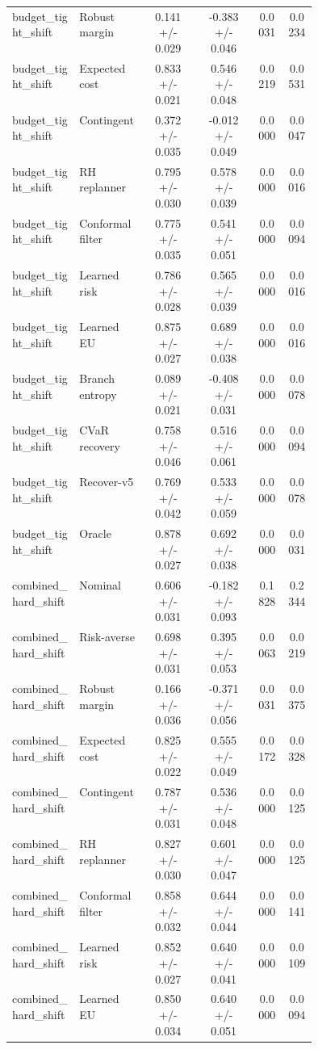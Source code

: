 \documentclass{article}
\begin{document}
\begin{center}
\begin{longtable}{p{0.22\linewidth}p{0.22\linewidth}cccc}
budget\_tight\_shift & Robust margin & 0.141 +/- 0.029 & -0.383 +/- 0.046 & 0.0031 & 0.0234\\
budget\_tight\_shift & Expected cost & 0.833 +/- 0.021 & 0.546 +/- 0.048 & 0.0219 & 0.0531\\
budget\_tight\_shift & Contingent & 0.372 +/- 0.035 & -0.012 +/- 0.049 & 0.0000 & 0.0047\\
budget\_tight\_shift & RH replanner & 0.795 +/- 0.030 & 0.578 +/- 0.039 & 0.0000 & 0.0016\\
budget\_tight\_shift & Conformal filter & 0.775 +/- 0.035 & 0.541 +/- 0.051 & 0.0000 & 0.0094\\
budget\_tight\_shift & Learned risk & 0.786 +/- 0.028 & 0.565 +/- 0.039 & 0.0000 & 0.0016\\
budget\_tight\_shift & Learned EU & 0.875 +/- 0.027 & 0.689 +/- 0.038 & 0.0000 & 0.0016\\
budget\_tight\_shift & Branch entropy & 0.089 +/- 0.021 & -0.408 +/- 0.031 & 0.0000 & 0.0078\\
budget\_tight\_shift & CVaR recovery & 0.758 +/- 0.046 & 0.516 +/- 0.061 & 0.0000 & 0.0094\\
budget\_tight\_shift & Recover-v5 & 0.769 +/- 0.042 & 0.533 +/- 0.059 & 0.0000 & 0.0078\\
budget\_tight\_shift & Oracle & 0.878 +/- 0.027 & 0.692 +/- 0.038 & 0.0000 & 0.0031\\
combined\_hard\_shift & Nominal & 0.606 +/- 0.031 & -0.182 +/- 0.093 & 0.1828 & 0.2344\\
combined\_hard\_shift & Risk-averse & 0.698 +/- 0.031 & 0.395 +/- 0.053 & 0.0063 & 0.0219\\
combined\_hard\_shift & Robust margin & 0.166 +/- 0.036 & -0.371 +/- 0.056 & 0.0031 & 0.0375\\
combined\_hard\_shift & Expected cost & 0.825 +/- 0.022 & 0.555 +/- 0.049 & 0.0172 & 0.0328\\
combined\_hard\_shift & Contingent & 0.787 +/- 0.031 & 0.536 +/- 0.048 & 0.0000 & 0.0125\\
combined\_hard\_shift & RH replanner & 0.827 +/- 0.030 & 0.601 +/- 0.047 & 0.0000 & 0.0125\\
combined\_hard\_shift & Conformal filter & 0.858 +/- 0.032 & 0.644 +/- 0.044 & 0.0000 & 0.0141\\
combined\_hard\_shift & Learned risk & 0.852 +/- 0.027 & 0.640 +/- 0.041 & 0.0000 & 0.0109\\
combined\_hard\_shift & Learned EU & 0.850 +/- 0.034 & 0.640 +/- 0.051 & 0.0000 & 0.0094\\

\end{longtable}
\end{center}
\end{document}
